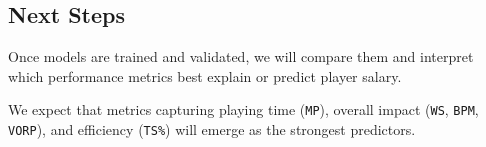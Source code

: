 \documentclass{article}
\theoremstyle{plain}
\theoremstyle{definition}
\theoremstyle{remark}
\begin{document}
\subsection*{Next Steps}

Once models are trained and validated, we will compare them and interpret which performance metrics best explain or predict player salary. 

We expect that metrics capturing playing time (\texttt{MP}), overall impact (\texttt{WS}, \texttt{BPM}, \texttt{VORP}), and efficiency (\texttt{TS\%}) will emerge as the strongest predictors.














\end{document}
